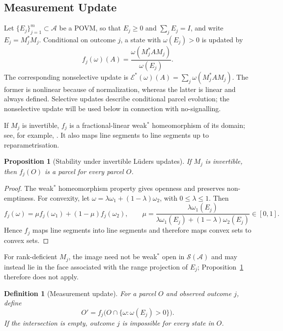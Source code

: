 \documentclass[11pt]{article}
\newtheorem{definition}[theorem]{Definition}
\newtheorem{proposition}[theorem]{Proposition}
\newcommand{\A}{\mathcal{A}}
\begin{document}
\subsection{Measurement Update}
\label{sec:measurement-update}

Let $\{E_j\}_{j=1}^m\subset\A$ be a POVM, so that $E_j\geq0$ and
$\sum_jE_j=I$, and write $E_j=M_j^*M_j$. Conditional on outcome $j$, a
state with $\omega(E_j)>0$ is updated by
\[
f_j(\omega)(A)
=
\frac{\omega(M_j^*AM_j)}{\omega(E_j)}.
\]
The corresponding nonselective update is
$\mathcal E^*(\omega)(A)=\sum_j\omega(M_j^*AM_j)$. The former is
nonlinear because of normalization, whereas the latter is linear and
always defined. Selective updates describe conditional parcel evolution;
the nonselective update will be used below in connection with
no-signalling.

If $M_j$ is invertible, $f_j$ is a fractional-linear weak$^*$
homeomorphism of its domain; see, for example,
\cite[Sec.~2.3]{brattelirobinson1}. It also maps line segments to line
segments up to reparametrisation.

\begin{proposition}[Stability under invertible L\"uders updates]
\label{prop:fj}
If $M_j$ is invertible, then $f_j(O)$ is a parcel for every parcel $O$.
\end{proposition}

\begin{proof}
The weak$^*$ homeomorphism property gives openness and preserves
non-emptiness. For convexity, let
$\omega=\lambda\omega_1+(1-\lambda)\omega_2$, with
$0\leq\lambda\leq1$. Then
\[
f_j(\omega)
=
\mu f_j(\omega_1)+(1-\mu)f_j(\omega_2),
\qquad
\mu=
\frac{\lambda\omega_1(E_j)}
{\lambda\omega_1(E_j)+(1-\lambda)\omega_2(E_j)}
\in[0,1].
\]
Hence $f_j$ maps line segments into line segments and therefore maps
convex sets to convex sets.
\end{proof}

For rank-deficient $M_j$, the image need not be weak$^*$ open in
$\mathcal S(\A)$ and may instead lie in the face associated with the range
projection of $E_j$; Proposition~\ref{prop:fj} therefore does not apply.

\begin{definition}[Measurement update]
\label{def:update}
For a parcel $O$ and observed outcome $j$, define
\[
O'
=
f_j\bigl(O\cap\{\omega:\omega(E_j)>0\}\bigr).
\]
If the intersection is empty, outcome $j$ is impossible for every state
in $O$.
\end{definition}
\end{document}
